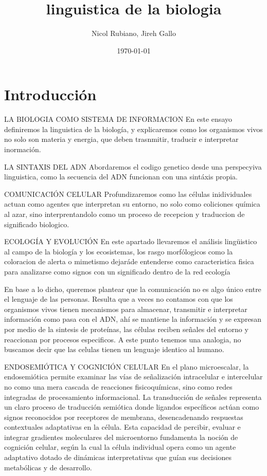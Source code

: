 \documentclass[12pt]{article}
\title{linguistica de la biologia}
\author{Nicol Rubiano, Jireh Gallo}
\date{\today}
\begin{document}
\maketitle

\section{Introducción}
LA BIOLOGIA COMO SISTEMA DE INFORMACION 
En este ensayo definiremos la linguistica de la biología, y explicaremos como los organismos vivos no solo son materia y energia,
que deben trasnmitir, traducir e interpretar inormación.

LA SINTAXIS DEL ADN
Abordaremos el codigo genetico desde una perspecyiva linguistica, como la secuencia del ADN funcionan con una sintáxis propia.

COMUNICACIÓN CELULAR
Profundizaremos como las células inidividuales actuan como agentes que interpretan su entorno, no solo como coliciones química al azar, sino interprentandolo como un proceso de recepcion y traduccion de significado biologico.

ECOLOGÍA Y EVOLUCIÓN
En este apartado llevaremos el análisis lingüistico al campo de la biología y los ecosistemas, los rasgo morfólogicos como la coloracion de alerta o mimetismo dejaráde entenderse como caracteristica fisica para analizarse como signos con un significado dentro de la red ecología 

En base a lo dicho, queremos plantear que la comunicación no es algo único entre el lenguaje de las personas. Resulta que a veces no contamos con que los organismos vivos tienen mecanismos para almacenar, transmitir e interpretar información como pasa con el ADN, ahí se mantiene la información y se expresan por medio de la sintesis de proteínas, las células reciben señales del entorno y reaccionan por procesos especificos. A este punto tenemos una analogia, no buscamos decir que las celulas tienen un lenguaje identico al humano.

ENDOSEMIÓTICA Y COGNICIÓN CELULAR
En el plano microescalar, la endosemiótica permite examinar las vías de señalización intracelular e intercelular no como una mera cascada de reacciones fisicoquímicas, sino como redes integradas de procesamiento informacional. La transducción de señales representa un claro proceso de traducción semiótica donde ligandos específicos actúan como signos reconocidos por receptores de membrana, desencadenando respuestas contextuales adaptativas en la célula. Esta capacidad de percibir, evaluar e integrar gradientes moleculares del microentorno fundamenta la noción de cognición celular, según la cual la célula individual opera como un agente adaptativo dotado de dinámicas interpretativas que guían sus decisiones metabólicas y de desarrollo.
\end{document}
